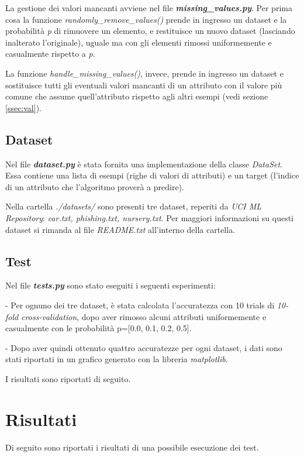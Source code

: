 \documentclass[a4paper,12pt]{article}
\begin{document}
La gestione dei valori mancanti avviene nel file \textit{\textbf{missing\_values.py}}. Per prima cosa la funzione \textit{randomly\_remove\_values()} prende in ingresso un dataset e la probabilità \textit{p} di rimuovere un elemento, e restituisce un nuovo dataset (lasciando inalterato l'originale), uguale ma con gli elementi rimossi uniformemente e casualmente rispetto a \textit{p}.


La funzione \textit{handle\_missing\_values()}, invece, prende in ingresso un dataset e sostituisce tutti gli eventuali valori mancanti di un attributo con il valore più comune che assume quell'attributo rispetto agli altri esempi (vedi sezione \ref{ssec:val}).

\subsection{Dataset}
Nel file \textit{\textbf{dataset.py}} è stata fornita una implementazione della classe \textit{DataSet}. Essa contiene una lista di esempi (righe di valori di attributi) e un target (l'indice di un attributo che l'algoritmo proverà a predire).
\newline

Nella cartella \textit{./datasets/} sono presenti tre dataset, reperiti da \textit{UCI ML Repository}: \textit{car.txt, phishing.txt, nursery.txt}. Per maggiori informazioni su questi dataset si rimanda al file \textit{README.txt} all'interno della cartella.

\subsection{Test}
Nel file \textit{\textbf{tests.py}} sono stato eseguiti i seguenti esperimenti:
\newline

- Per ognuno dei tre dataset, è stata calcolata l'accuratezza con 10 trials di \textit{10-fold cross-validation}, dopo aver rimosso alcuni attributi uniformemente e casualmente con le probabilità p=[0.0, 0.1, 0.2, 0.5].
\newline

- Dopo aver quindi ottenuto quattro accuratezze per ogni dataset, i dati sono stati riportati in un grafico generato con la libreria \textit{matplotlib}. 
\newline

I risultati sono riportati di seguito.

\clearpage
\section{Risultati} \label{ssec:ris}
Di seguito sono riportati i risultati di una possibile esecuzione dei test.
\end{document}
